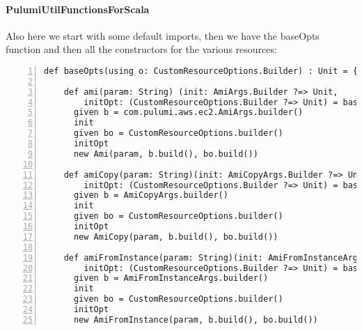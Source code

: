 
\paragraph{PulumiUtilFunctionsForScala}
Also here we start with some default imports, then we have the baseOpts function and then all the constructors for the various resources:\\
\begin{minipage}{\linewidth}
  \begin{lstlisting}[numbers=left, numberstyle=\tiny, numbersep=-5pt, stepnumber=1]
    def baseOpts(using o: CustomResourceOptions.Builder) : Unit = {} 

    def ami(param: String) (init: AmiArgs.Builder ?=> Unit, 
        initOpt: (CustomResourceOptions.Builder ?=> Unit) = baseOpts): Ami =
      given b = com.pulumi.aws.ec2.AmiArgs.builder()
      init
      given bo = CustomResourceOptions.builder()
      initOpt
      new Ami(param, b.build(), bo.build())
    
    def amiCopy(param: String)(init: AmiCopyArgs.Builder ?=> Unit, 
        initOpt: (CustomResourceOptions.Builder ?=> Unit) = baseOpts): AmiCopy =
      given b = AmiCopyArgs.builder()
      init
      given bo = CustomResourceOptions.builder()
      initOpt
      new AmiCopy(param, b.build(), bo.build())
    
    def amiFromInstance(param: String)(init: AmiFromInstanceArgs.Builder ?=> Unit, 
        initOpt: (CustomResourceOptions.Builder ?=> Unit) = baseOpts): AmiFromInstance =
      given b = AmiFromInstanceArgs.builder()
      init
      given bo = CustomResourceOptions.builder()
      initOpt
      new AmiFromInstance(param, b.build(), bo.build())
  \end{lstlisting}
\end{minipage}


